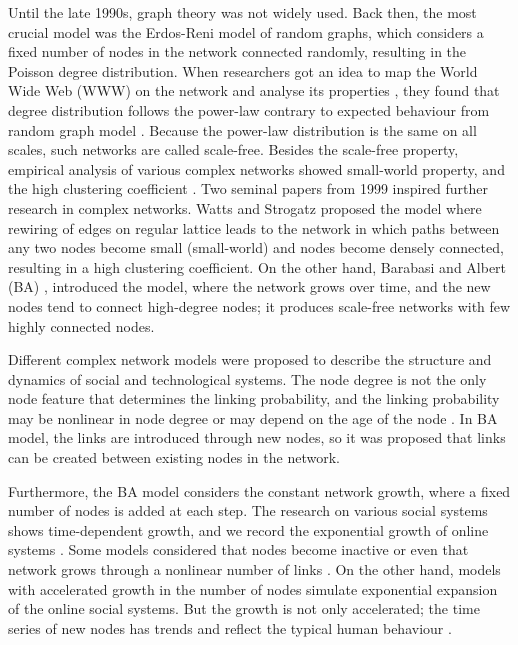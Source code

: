 Until the late 1990s, graph theory was not widely used. Back then, the most crucial model was the Erdos-Reni model of random graphs, which considers a fixed number of nodes in the network connected randomly, resulting in the Poisson degree distribution. When researchers got an idea to map the World Wide Web (WWW) on the network and analyse its properties \cite{huberman1999}, they found that degree distribution follows the power-law contrary to expected behaviour from random graph model \cite{dorogovtsev2010complex}. Because the power-law distribution is the same on all scales, such networks are called scale-free. Besides the scale-free property, empirical analysis of various complex networks showed small-world property, and the high clustering coefficient \cite{barabasi2009,newman2010}. Two seminal papers from 1999 inspired further research in complex networks. Watts and Strogatz \cite{watts1998collective} proposed the model where rewiring of edges on regular lattice leads to the network in which paths between any two nodes become small (small-world) and nodes become densely connected, resulting in a high clustering coefficient. On the other hand, Barabasi and Albert (BA) \cite{barabasi1999}, introduced the model, where the network grows over time, and the new nodes tend to connect high-degree nodes; it produces scale-free networks with few highly connected nodes. 

Different complex network models were proposed to describe the structure and dynamics of social and technological systems. The node degree is not the only node feature that determines the linking probability, and the linking probability may be nonlinear in node degree or may depend on the age of the node \cite{dorogovtsev2000b, dorogovtsev2001b}. In BA model, the links are introduced through new nodes, so it was proposed that links can be created between existing nodes in the network.  

Furthermore, the BA model considers the constant network growth, where a fixed number of nodes is added at each step. The research on various social systems shows time-dependent growth, and we record the exponential growth of online systems \cite{liu2019}. Some models considered that nodes become inactive or even that network grows through a nonlinear number of links \cite{pham2016}. On the other hand, models with accelerated growth in the number of nodes \cite{sen2004} simulate exponential expansion of the online social systems. But the growth is not only accelerated; the time series of new nodes has trends and reflect the typical human behaviour \cite{mitrovic2010a, mitrovic2012,mitrovic2015}.


